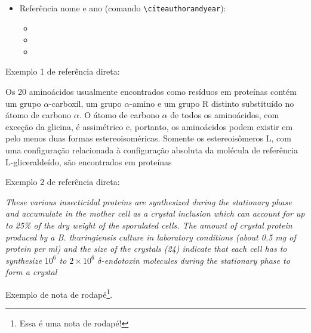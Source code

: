 \begin{itemize}
\begin{itemize}
		\item \cite{Agaisse1995, Abedi2014};
		\item \cite{Nelson2014, BtNomenclature2016, AgapitoTenfen2014};
	\end{itemize}
	\item Referência nome e ano (comando \verb|\citeauthorandyear|):
	\begin{itemize}
		\item %
		\item %
		\item %
	\end{itemize}
\end{itemize}


Exemplo 1 de referência direta:

\begin{citacao}
	Os 20 aminoácidos usualmente encontrados como resíduos em proteínas contém um grupo $\alpha$-carboxil, um grupo $\alpha$-amino e um grupo R distinto substituído no átomo de carbono $\alpha$. O átomo de carbono $\alpha$ de todos os aminoácidos, com exceção da glicina, é assimétrico e, portanto, os aminoácidos podem existir em pelo menos duas formas estereoisoméricas. Somente os estereoisômeros L, com uma configuração relacionada à configuração absoluta da molécula de referência L-gliceraldeído, são encontrados em proteínas \cite[p. 81]{Nelson2014}
\end{citacao}

Exemplo 2 de referência direta:

\begin{citacao}
	\textit{These various insecticidal proteins are synthesized during the stationary phase and accumulate in the mother cell as a crystal inclusion which can account for up to 25\% of the dry weight of the sporulated cells. The amount of crystal protein produced by a B. thuringiensis culture in laboratory conditions (about 0.5 mg of protein per ml) and the size of the crystals (24) indicate that each cell has to synthesize $10^6$ to $2 \times 10^6$ $\delta$-endotoxin molecules during the stationary phase to form a crystal} \cite[p. 1]{Agaisse1995}
\end{citacao}

Exemplo de nota de rodapé\footnote{Essa é uma nota de rodapé!}.
